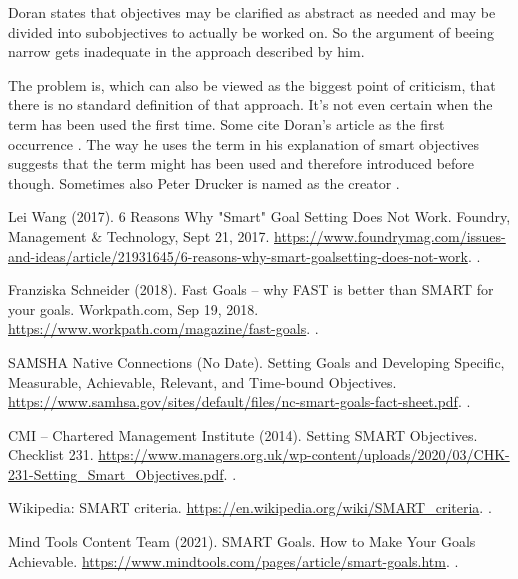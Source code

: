 \documentclass[11pt,a4paper]{article}
\begin{document}
Doran states that objectives may be clarified as abstract as needed and may be
divided into subobjectives to actually be worked on. So the argument of beeing
narrow gets inadequate in the approach described by him.

The problem is, which can also be viewed as the biggest point of criticism,
that there is no standard definition of that approach. It's not even certain
when the term has been used the first time. Some cite Doran's article
\cite{doran1981there} as the first occurrence \cite{wikipedia,
  managersorg}. The way he uses the term in his explanation of smart
objectives suggests that the term might has been used and therefore introduced
before though. Sometimes also Peter Drucker is named as the creator
\cite{managersorg}.

%
\raggedright
\begin{thebibliography}{xxx}

 Lei Wang (2017). 6 Reasons Why "Smart" Goal Setting
  Does Not Work.  Foundry, Management \& Technology, Sept 21, 2017.
  \url{https://www.foundrymag.com/issues-and-ideas/article/21931645/6-reasons-why-smart-goalsetting-does-not-work}.
  .

 Franziska Schneider (2018). Fast Goals -- why FAST is
  better than SMART for your goals. Workpath.com, Sep 19, 2018.
\newblock \url{https://www.workpath.com/magazine/fast-goals}.
.

 SAMSHA Native Connections (No Date).  {Setting Goals and
  Developing Specific, Measurable, Achievable, Relevant, and Time-bound
  Objectives}.  \newblock
  \url{https://www.samhsa.gov/sites/default/files/nc-smart-goals-fact-sheet.pdf}.
  .

 CMI -- Chartered Management Institute (2014).  Setting
  SMART Objectives. Checklist 231.  \newblock
  \url{https://www.managers.org.uk/wp-content/uploads/2020/03/CHK-231-Setting_Smart_Objectives.pdf}.
  .

 Wikipedia: SMART criteria.  \newblock
  \url{https://en.wikipedia.org/wiki/SMART_criteria}.  .

 Mind Tools Content Team (2021). SMART Goals.  How to Make
  Your Goals Achievable.  \newblock
  \url{https://www.mindtools.com/pages/article/smart-goals.htm}.  .


\end{thebibliography}
\end{document}
